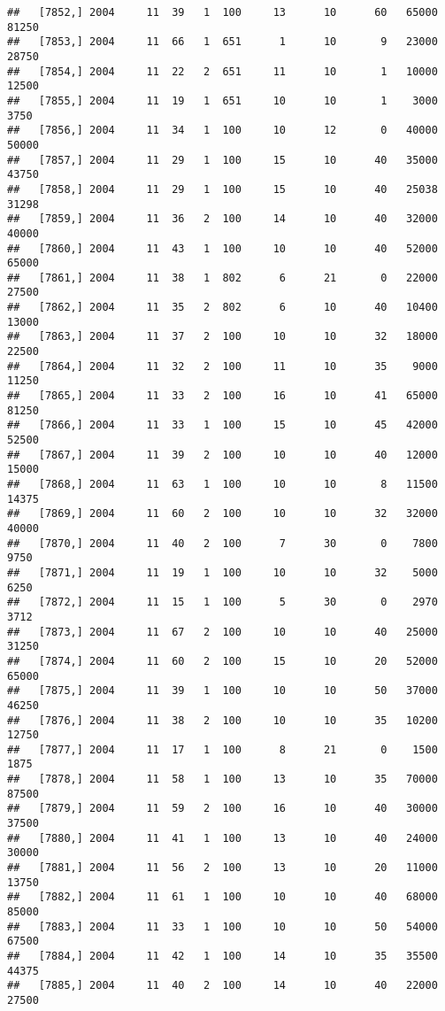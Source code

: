 \documentclass{article}\usepackage[]{graphicx}\usepackage[]{color}
\makeatletter
\newenvironment{kframe}{%
 \def\at@end@of@kframe{}%
 \ifinner\ifhmode%
  \def\at@end@of@kframe{\end{minipage}}%
  \begin{minipage}{\columnwidth}%
 \fi\fi%
 \def\FrameCommand##1{\hskip\@totalleftmargin \hskip-\fboxsep
 \colorbox{shadecolor}{##1}\hskip-\fboxsep
     \hskip-\linewidth \hskip-\@totalleftmargin \hskip\columnwidth}%
 \MakeFramed {\advance\hsize-\width
   \@totalleftmargin\z@ \linewidth\hsize
   \@setminipage}}%
 {\par\unskip\endMakeFramed%
 \at@end@of@kframe}
\newenvironment{knitrout}{}{} %
\makeatother
\begin{document}
\begin{knitrout}
\begin{kframe}
\begin{verbatim}
##   [7852,] 2004     11  39   1  100     13      10      60   65000   81250
##   [7853,] 2004     11  66   1  651      1      10       9   23000   28750
##   [7854,] 2004     11  22   2  651     11      10       1   10000   12500
##   [7855,] 2004     11  19   1  651     10      10       1    3000    3750
##   [7856,] 2004     11  34   1  100     10      12       0   40000   50000
##   [7857,] 2004     11  29   1  100     15      10      40   35000   43750
##   [7858,] 2004     11  29   1  100     15      10      40   25038   31298
##   [7859,] 2004     11  36   2  100     14      10      40   32000   40000
##   [7860,] 2004     11  43   1  100     10      10      40   52000   65000
##   [7861,] 2004     11  38   1  802      6      21       0   22000   27500
##   [7862,] 2004     11  35   2  802      6      10      40   10400   13000
##   [7863,] 2004     11  37   2  100     10      10      32   18000   22500
##   [7864,] 2004     11  32   2  100     11      10      35    9000   11250
##   [7865,] 2004     11  33   2  100     16      10      41   65000   81250
##   [7866,] 2004     11  33   1  100     15      10      45   42000   52500
##   [7867,] 2004     11  39   2  100     10      10      40   12000   15000
##   [7868,] 2004     11  63   1  100     10      10       8   11500   14375
##   [7869,] 2004     11  60   2  100     10      10      32   32000   40000
##   [7870,] 2004     11  40   2  100      7      30       0    7800    9750
##   [7871,] 2004     11  19   1  100     10      10      32    5000    6250
##   [7872,] 2004     11  15   1  100      5      30       0    2970    3712
##   [7873,] 2004     11  67   2  100     10      10      40   25000   31250
##   [7874,] 2004     11  60   2  100     15      10      20   52000   65000
##   [7875,] 2004     11  39   1  100     10      10      50   37000   46250
##   [7876,] 2004     11  38   2  100     10      10      35   10200   12750
##   [7877,] 2004     11  17   1  100      8      21       0    1500    1875
##   [7878,] 2004     11  58   1  100     13      10      35   70000   87500
##   [7879,] 2004     11  59   2  100     16      10      40   30000   37500
##   [7880,] 2004     11  41   1  100     13      10      40   24000   30000
##   [7881,] 2004     11  56   2  100     13      10      20   11000   13750
##   [7882,] 2004     11  61   1  100     10      10      40   68000   85000
##   [7883,] 2004     11  33   1  100     10      10      50   54000   67500
##   [7884,] 2004     11  42   1  100     14      10      35   35500   44375
##   [7885,] 2004     11  40   2  100     14      10      40   22000   27500

\end{verbatim}
\end{kframe}
\end{knitrout}
\end{document}
